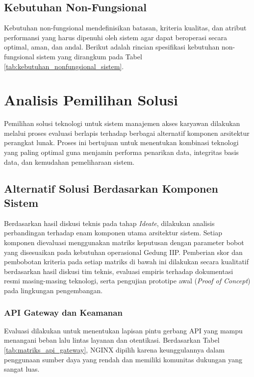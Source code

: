 \subsection{Kebutuhan Non-Fungsional}
Kebutuhan non-fungsional mendefinisikan batasan, kriteria kualitas, dan atribut performansi yang harus dipenuhi oleh sistem agar dapat beroperasi secara optimal, aman, dan andal. Berikut adalah rincian spesifikasi kebutuhan non-fungsional sistem yang dirangkum pada Tabel \ref{tab:kebutuhan_nonfungsional_sistem}.



\section{Analisis Pemilihan Solusi}
Pemilihan solusi teknologi untuk sistem manajemen akses karyawan dilakukan melalui proses evaluasi berlapis terhadap berbagai alternatif komponen arsitektur perangkat lunak. Proses ini bertujuan untuk menentukan kombinasi teknologi yang paling optimal guna menjamin performa penarikan data, integritas basis data, dan kemudahan pemeliharaan sistem.

\subsection{Alternatif Solusi Berdasarkan Komponen Sistem}
Berdasarkan hasil diskusi teknis pada tahap \textit{Ideate}, dilakukan analisis perbandingan terhadap enam komponen utama arsitektur sistem. Setiap komponen dievaluasi menggunakan matriks keputusan dengan parameter bobot yang disesuaikan pada kebutuhan operasional Gedung IIP. Pemberian skor dan pembobotan kriteria pada setiap matriks di bawah ini dilakukan secara kualitatif berdasarkan hasil diskusi tim teknis, evaluasi empiris terhadap dokumentasi resmi masing-masing teknologi, serta pengujian prototipe awal (\textit{Proof of Concept}) pada lingkungan pengembangan.

\subsubsection{API Gateway dan Keamanan}
Evaluasi dilakukan untuk menentukan lapisan pintu gerbang API yang mampu menangani beban lalu lintas layanan dan otentikasi. Berdasarkan Tabel \ref{tab:matriks_api_gateway}, NGINX dipilih karena keunggulannya dalam penggunaan sumber daya yang rendah dan memiliki komunitas dukungan yang sangat luas.


